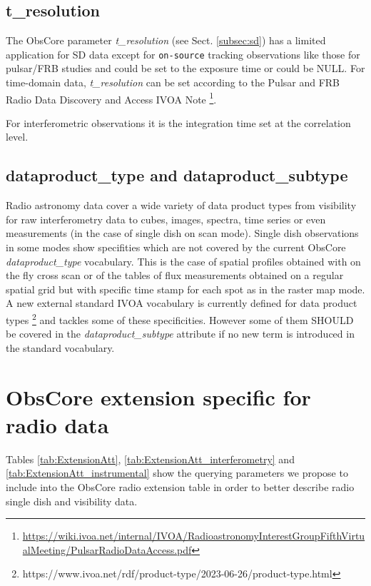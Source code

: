 \documentclass[11pt,a4paper]{ivoa}
\begin{document}
\subsection{t\_resolution}
The ObsCore parameter \emph{t\_resolution} (see Sect. \ref{subsec:sd}) has a limited application for SD data
except for \texttt{on-source} tracking observations like those for pulsar/FRB studies and could be set to the
exposure time or could be NULL. For time-domain data, \emph{t\_resolution} can be set according to the Pulsar
and FRB Radio Data Discovery and Access IVOA Note \footnote{\url{https://wiki.ivoa.net/internal/IVOA/RadioastronomyInterestGroupFifthVirtualMeeting/PulsarRadioDataAccess.pdf}}.

For interferometric observations it is the integration time set at the correlation level.

\subsection{dataproduct\_type and dataproduct\_subtype}

Radio astronomy data cover a wide variety of data product types from visibility for raw interferometry data to cubes, images, spectra, time series
or even measurements (in the case of single dish on scan mode). Single dish observations in some modes show specifities which are not covered by
the current ObsCore \emph{dataproduct\_type} vocabulary. This is the case of spatial profiles obtained with on the fly cross scan or of the
tables of flux measurements obtained on a regular spatial grid but with specific time stamp for each spot as in the raster map  mode.
A new external standard IVOA vocabulary is currently defined for data product types \footnote{https://www.ivoa.net/rdf/product-type/2023-06-26/product-type.html}
and tackles some of these specificities. However some of them SHOULD be covered in the \emph{dataproduct\_subtype} attribute if no new term is introduced in the standard vocabulary.

\section{ObsCore extension specific for radio data}

Tables \ref{tab:ExtensionAtt}, \ref{tab:ExtensionAtt_interferometry} and \ref{tab:ExtensionAtt_instrumental} show the 
querying parameters we propose to include into the ObsCore radio extension table in order to better describe radio single dish and visibility data.
\end{document}
